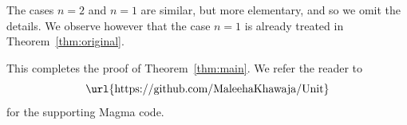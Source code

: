 \documentclass{amsart}
\DeclareMathOperator{\Gal}{Gal}
\theoremstyle{definition}
\theoremstyle{remark}
\begin{document}
\medskip

The cases $n=2$ and $n=1$ are similar, but more elementary, and so we omit the details.
We observe however that the case $n=1$ is already treated in Theorem~\ref{thm:original}.

This completes the proof of Theorem~\ref{thm:main}. We refer the reader to 
\[
	\text{\url{https://github.com/MaleehaKhawaja/Unit}} 
\]
for the supporting Magma code.


\end{document}
